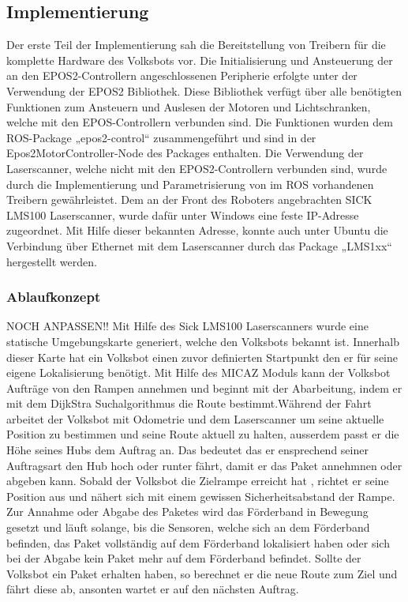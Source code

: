 \subsection{Implementierung}

Der erste Teil der Implementierung sah die Bereitstellung von Treibern für die komplette Hardware des Volksbots vor. Die Initialisierung und Ansteuerung der an den EPOS2-Controllern angeschlossenen Peripherie erfolgte unter der Verwendung der EPOS2 Bibliothek. Diese Bibliothek verfügt über alle benötigten Funktionen zum Ansteuern und Auslesen der Motoren und Lichtschranken, welche mit den EPOS-Controllern verbunden sind. Die Funktionen wurden dem ROS-Package „epos2-control“ zusammengeführt und sind in der Epos2MotorController-Node des Packages enthalten. 
Die Verwendung der Laserscanner, welche nicht mit den EPOS2-Controllern verbunden sind, wurde durch die Implementierung und Parametrisierung von im ROS vorhandenen Treibern gewährleistet. Dem an der Front des Roboters angebrachten SICK LMS100 Laserscanner, wurde dafür unter Windows eine feste IP-Adresse zugeordnet. Mit Hilfe dieser bekannten Adresse, konnte auch unter Ubuntu die Verbindung über Ethernet mit dem Laserscanner durch das Package „LMS1xx“  hergestellt werden.

\subsubsection{Ablaufkonzept}

NOCH ANPASSEN!!
Mit Hilfe des Sick LMS100 Laserscanners wurde eine statische Umgebungskarte generiert, welche den Volksbots bekannt ist. Innerhalb dieser Karte hat ein Volksbot einen zuvor definierten Startpunkt den er für seine eigene Lokalisierung benötigt. Mit Hilfe des MICAZ Moduls kann der Volksbot Aufträge von den Rampen annehmen und beginnt mit der Abarbeitung, indem er mit dem DijkStra Suchalgorithmus die Route bestimmt.Während der Fahrt arbeitet der Volksbot mit Odometrie und dem Laserscanner um seine aktuelle Position zu bestimmen und seine Route aktuell zu halten, ausserdem passt er die Höhe seines Hubs dem Auftrag an. Das bedeutet das er ensprechend seiner Auftragsart den Hub hoch oder runter fährt, damit er das Paket annehmnen oder abgeben kann. Sobald der Volksbot die Zielrampe erreicht hat , richtet er seine Position aus und nähert sich mit einem gewissen Sicherheitsabstand der Rampe. Zur Annahme oder Abgabe des Paketes wird das Förderband in Bewegung gesetzt und läuft solange, bis die Sensoren, welche sich an dem Förderband befinden, das Paket vollständig auf dem Förderband lokalisiert haben oder sich bei der Abgabe kein Paket mehr auf dem Förderband befindet. Sollte der Volksbot ein Paket erhalten haben, so berechnet er die neue Route zum Ziel und fährt diese ab, ansonten wartet er auf den nächsten Auftrag.

